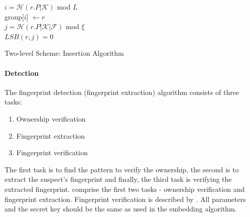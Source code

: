 \begin{algorithm}
    {
        $i = \mathcal{H}(r.P|\mathcal{K})$ mod $L$ \\
        group[$i$] $\leftarrow r$ \\ 
        {
            $j=\mathcal{H}(r.P|\mathcal{K}|\mathcal{F})$ mod $\xi$\\
            {
                $LSB(r,j)=0$\\
            }
        }
        
    }
  \caption{Two-level Scheme: Insertion Algorithm}
  \label{alg:two-level-insertion} 
\end{algorithm}

\paragraph{Detection}
The fingerprint detection (fingerprint extraction) algorithm consists of three tasks: 
\begin{enumerate}
    \item Ownership verification
    \item Fingerprint extraction
    \item Fingerprint verification
\end{enumerate}
The first task is to find the pattern to verify the ownership, the second is to extract the suspect's fingerprint and finally, the third task is verifying the extracted fingerprint.  comprise the first two tasks - ownership verification and fingerprint extraction. 
Fingerprint verification is described by .
All parameters and the secret key should be the same as used in the embedding algorithm. 

